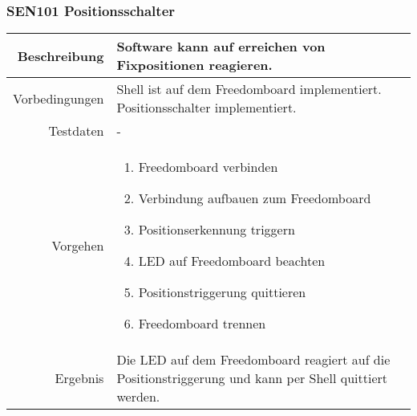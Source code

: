 \subsubsection{SEN101 Positionsschalter}
\begin{table}[h!]
	\renewcommand{\arraystretch}{1.5}
	\begin{tabular}{|r|p{13cm}|}
		\hline Beschreibung	&
			Software kann auf erreichen von Fixpositionen reagieren. \\ 
		\hline Vorbedingungen	&
			Shell ist auf dem Freedomboard implementiert.
			Positionsschalter implementiert. \\ 
		\hline Testdaten	& - \\ 
		\hline Vorgehen		& 
		\begin{enumerate}
			\item Freedomboard verbinden
			\item Verbindung aufbauen zum Freedomboard
			\item Positionserkennung triggern
			\item LED auf Freedomboard beachten
			\item Positionstriggerung quittieren
			\item Freedomboard trennen
		\end{enumerate} \\ 
		\hline Ergebnis 	&
			Die LED auf dem Freedomboard reagiert auf die
			Positionstriggerung und kann per Shell quittiert werden.\\ 
		\hline 
	\end{tabular}
\end{table}


